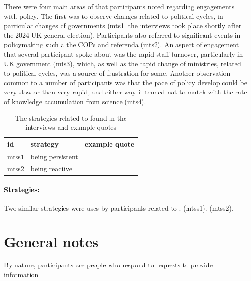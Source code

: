 There were four main areas of \ismmts{} that participants noted regarding engagements with policy. The first was to observe changes related to political cycles, in particular changes of governments (mts1; the interviews took place shortly after the 2024 UK general election). Participants also referred to significant events in policymaking such a the COPs and referenda (mts2). An aspect of engagement that several participant spoke about was the rapid staff turnover, particularly in UK government (mts3), which, as well as the rapid change of ministries, related to political cycles, was a source of frustration for some. Another observation common to a number of participants was that the pace of policy develop could be very slow or then very rapid, and either way it tended not to match with the rate of knowledge accumulation from science (mts4). 

\begin{table}[!ht]
\footnotesize
\caption{The strategies related to \ismmts{} found in the interviews and example quotes}\label{tab:restimestrat}
\begin{tabular}{L{.06\linewidth}L{.3\linewidth}L{.64\linewidth}} \hline
\textbf{id} & \textbf{strategy} & \textbf{example quote} \\ \hline \hline
mtss1 & being persistent &  \\[5mm]
mtss2 & being reactive &  \\[5mm]
 \hline
 \end{tabular}
\end{table}

\paragraph{Strategies:}
Two similar strategies were uses by participants related to \ismmts.  (mtss1).  (mtss2).

\section{General notes}


By nature, participants are people who respond to requests to provide information


%
